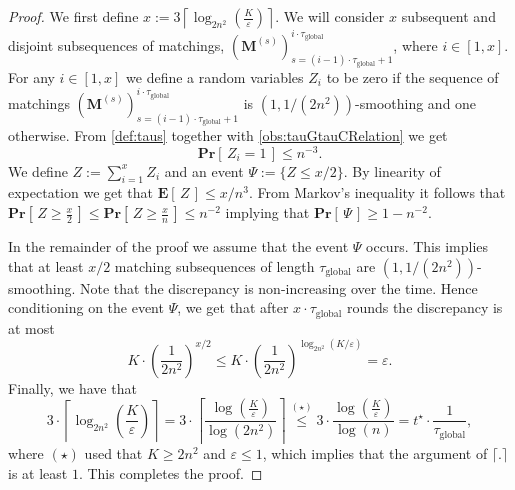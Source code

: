\documentclass[twoside,leqno]{article}
\newcommand{\Pro}[1]{\mathbf{Pr} \left[\,#1\,\right]}
\newcommand{\Ex}[1]{\mathbf{E} \left[\,#1\,\right]}
\newcommand{\M}{\mathbf{M}}
\DeclareMathOperator{\1}{\mathbf{1}}
\newcommand{\tauglobal}{\tau_{\mathrm{global}}}
\numberwithin{equation}{section}
\let\epsilon\varepsilon
\begin{document}
\begin{proof}\label{Pr:TaglobalSmoothingRelation}
We first define $x:=3\left\lceil\log_{2n^2} (\frac{K}{\epsilon})\right \rceil$. We will consider $x$ subsequent and disjoint subsequences of matchings, 
$\left(\M^{(s)}\right)_{s=(i-1)\cdot \tauglobal+1}^{i\cdot \tauglobal}$, where $i \in [1,x]$. For any $i\in \left[1, x \right]$ we define a random variables $Z_i$ to be zero if  the sequence of matchings $\left(\M^{(s)}\right)_{s=(i-1)\cdot \tauglobal+1}^{i\cdot \tauglobal}$ is $(1,1/(2n^2))$-smoothing and one otherwise.
From \cref{def:taus} together with \cref{obs:tauGtauCRelation} we get
\[
\Pro{Z_i=1} \le n^{-3}.
\]
We define $Z:=\sum_{i=1}^{x}Z_i$ and an event
$
\Psi :=\{Z\le x/2\}.
$
By linearity of expectation we get that
$\Ex{Z} \le x/n^3$. From Markov's inequality it follows that
$\Pro{Z\ge \frac{x}{2}} \le \Pro{Z\ge \frac{x}{n}}\le n^{-2}$ implying that
$\Pro{\Psi}\ge 1-n^{-2}$.

In the remainder of the proof we assume that the event $\Psi$ occurs. This implies that at least $x/2$ matching subsequences of length $\tauglobal$ are $(1,1/(2n^2))$-smoothing.
Note that the discrepancy is non-increasing over the time. Hence conditioning on the event $\Psi$, we get that after $x\cdot \tauglobal$ rounds the discrepancy is at most
\[K\cdot \left(\frac{1}{2n^2}\right)^{x/2} \le K\cdot \left(\frac{1}{2n^2}\right)^{\log_{2n^2} (K/\epsilon)} = \epsilon.\]
Finally, we have that
\[
3\cdot \left\lceil\log_{2n^2}\left(\frac{K}{\epsilon}\right) \right\rceil = 3\cdot \left\lceil\frac{\log (\frac{K}{\epsilon})}{\log (2n^2)} \right \rceil \stackrel{(\star)}{\le} 3 \cdot \frac{\log (\frac{K}{\epsilon})}{\log(n)} = t^{\star} \cdot \frac{1}{\tauglobal},
\]
where $(\star)$ used that $K \geq 2n^2$ and $\epsilon \leq 1$, which implies that the argument of $\lceil . \rceil$ is at least $1$. This completes the proof.
\end{proof}
\end{document}
